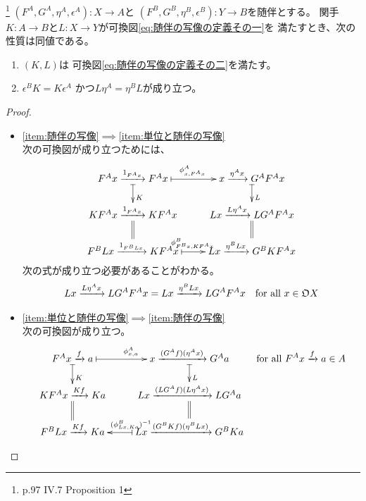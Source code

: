 {	\begin{proposition}[随伴の写像]\label{prop:随伴の写像} %
		\footnote{\cite{maclane.work} p.97 IV.7 Proposition 1}
		$(F^A,G^A,\eta^A,\epsilon^A):X\to A$と
		$(F^B,G^B,\eta^B,\epsilon^B):Y\to B$を随伴とする。
		関手$K:A\to B$と$L:X\to Y$が可換図\eqref{eq:随伴の写像の定義その一}を
		満たすとき、次の性質は同値である。
		\begin{enumerate}\setlength{\itemsep}{-1mm} %
			\item\label{item:随伴の写像} $(K,L)$は
			可換図\eqref{eq:随伴の写像の定義その二}を満たす。
			\item\label{item:単位と随伴の写像} $\epsilon^BK=K\epsilon^A$
			かつ$L\eta^A=\eta^BL$が成り立つ。
		\end{enumerate} %
	\end{proposition} %
	\begin{proof} %
		\begin{itemize}\setlength{\itemsep}{-1mm} %
			\item\ref{item:随伴の写像}$\implies$\ref{item:単位と随伴の写像} \\
			次の可換図が成り立つためには、
			\begin{equation*}\xymatrix@R=4ex{
				F^Ax\xto{1_{F^Ax}}F^Ax \ar@{|->}[r]^{\phi^A_{x,F^Ax}} \ar@{|->}[d]^K
				& x\xto{\eta^Ax}G^AF^Ax \ar@{|->}[d]^L \\
				KF^Ax\xto{1_{F^Ax}}KF^Ax \ar@{=}[d] 
				& Lx\xto{L\eta^Ax}LG^AF^Ax \ar@{=}[d] \\
				F^BLx\xto{1_{F^BLx}}KF^Ax \ar@{|->}[r]^{\phi^B_{F^Bx,KF^Ax}}
				& Lx\xto{\eta^BLx}G^BKF^Ax \\
			}\end{equation*}
			次の式が成り立つ必要があることがわかる。
			\begin{equation*}\begin{split}
				Lx\xrightarrow[{}]{L\eta^Ax}LG^AF^Ax = Lx\xrightarrow[{}]{\eta^BLx}LG^AF^Ax
				\quad\text{for all } x\in\mathfrak{O} X
			\end{split}\end{equation*}
			\item \ref{item:単位と随伴の写像}$\implies$\ref{item:随伴の写像} \\
			次の可換図が成り立つ。
			\begin{equation*}\xymatrix@R=4ex{
				F^Ax\xto{f}a \ar@{|->}[r]^{\phi^A_{x,a}} \ar@{|->}[d]^K
				& x\xto{(G^Af)(\eta^Ax)}G^Aa \ar@{|->}[d]^L \\
				KF^Ax\xto{Kf}Ka \ar@{=}[d] 
				& Lx\xto{(LG^Af)(L\eta^Ax)}LG^Aa \ar@{=}[d] \\
				F^BLx\xto{Kf}Ka \ar@{<-|}[r]^{(\phi^B_{Lx,Ka})^{-1}}
				& Lx\xto{(G^BKf)(\eta^BLx)}G^BKa \\
			} \quad\text{for all } F^Ax\xto{f}a\in A
			\end{equation*}
		\end{itemize} %
	\end{proof} %
}
